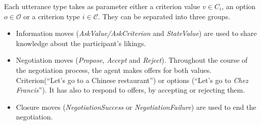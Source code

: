 \documentclass[runningheads,a4paper]{llncs}
\begin{document}
	
	Each utterance type takes as parameter either a criterion value $v \in C_i$, an option $o \in \mathcal{O}$ or a criterion type $i \in \mathcal{C}$. They can be separated into three groups. 
	
	\begin{itemize}
	\item Information moves (\textit{AskValue/AskCriterion} and \textit{StateValue}) are used to share knowledge about the participant's likings.
	\item Negotiation moves (\textit{Propose}, \textit{Accept} and \textit{Reject}). Throughout the course of the negotiation process, the agent makes offers for both values. Criterion(``Let's go to a Chinese restaurant'') or options (``Let's go to \emph{Chez Francis}''). It has also to respond to offers, by accepting or rejecting them.

	\item Closure moves (\textit{NegotiationSuccess} or \textit{NegotiationFailure}) are used to end the negotiation.
	\end{itemize}
	
	
\end{document}

